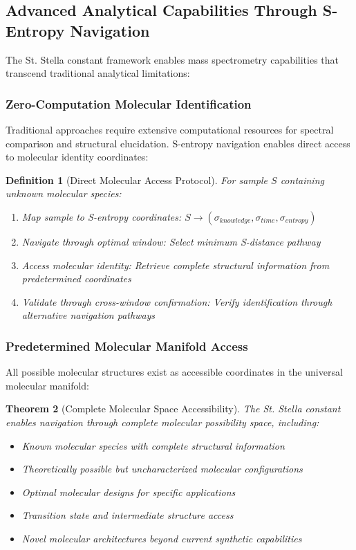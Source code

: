 \documentclass[11pt,a4paper]{article}
\newtheorem{theorem}{Theorem}[section]
\newtheorem{definition}[theorem]{Definition}
\theoremstyle{remark}
\begin{document}
\subsection{Advanced Analytical Capabilities Through S-Entropy Navigation}

The St. Stella constant framework enables mass spectrometry capabilities that transcend traditional analytical limitations:

\subsubsection{Zero-Computation Molecular Identification}

Traditional approaches require extensive computational resources for spectral comparison and structural elucidation. S-entropy navigation enables direct access to molecular identity coordinates:

\begin{definition}[Direct Molecular Access Protocol]
For sample $S$ containing unknown molecular species:
\begin{enumerate}
\item Map sample to S-entropy coordinates: $S \rightarrow (\sigma_{knowledge}, \sigma_{time}, \sigma_{entropy})$
\item Navigate through optimal window: Select minimum S-distance pathway
\item Access molecular identity: Retrieve complete structural information from predetermined coordinates
\item Validate through cross-window confirmation: Verify identification through alternative navigation pathways
\end{enumerate}
\end{definition}

\subsubsection{Predetermined Molecular Manifold Access}

All possible molecular structures exist as accessible coordinates in the universal molecular manifold:

\begin{theorem}[Complete Molecular Space Accessibility]
The St. Stella constant enables navigation through complete molecular possibility space, including:
\begin{itemize}
\item Known molecular species with complete structural information
\item Theoretically possible but uncharacterized molecular configurations  
\item Optimal molecular designs for specific applications
\item Transition state and intermediate structure access
\item Novel molecular architectures beyond current synthetic capabilities
\end{itemize}
\end{theorem}
\end{document}
